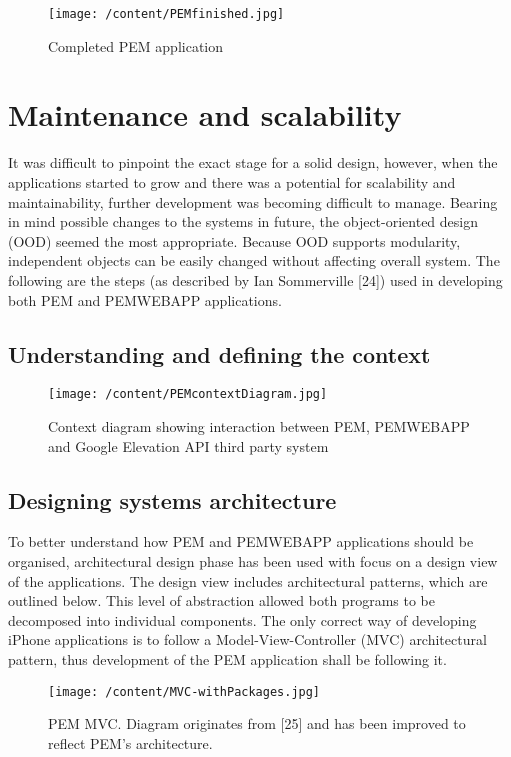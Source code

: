 \documentclass[12pt, a4paper]{report}   %
\begin{document}
\begin{enumerate}
\begin{figure}[H]
  \centering
	\texttt{[image: /content/PEMfinished.jpg]}
	  \caption{Completed PEM application}
\end{figure}


\clearpage
\section{Maintenance and scalability}
It was difficult to pinpoint the exact stage for a solid design, however, when the applications started to grow and there was a potential for scalability and maintainability, further development was becoming difficult to manage. Bearing in mind possible changes to the systems in future, the object-oriented design (OOD) seemed the most appropriate. Because OOD supports modularity, independent objects can be easily changed without affecting overall system. The following are the steps (as described by Ian Sommerville [24]) used in developing both PEM and PEMWEBAPP applications.


\subsection{Understanding and defining the context}
	
	
\begin{figure}[H]
  \centering
	\texttt{[image: /content/PEMcontextDiagram.jpg]}
	  \caption{Context diagram showing interaction between PEM, PEMWEBAPP and Google Elevation API third party system}
\end{figure}


\subsection{Designing systems architecture}
To better understand how PEM and PEMWEBAPP applications should be organised, architectural design phase has been used with focus on a design view of the applications. The design view includes architectural patterns, which are outlined below. This level of abstraction allowed both programs to be decomposed into individual components. The only correct way of developing iPhone applications is to follow a Model-View-Controller (MVC) architectural pattern, thus development of the PEM application shall be following it.\\
	

\begin{figure}[H]
  \centering
	\texttt{[image: /content/MVC-withPackages.jpg]}
	  \caption{PEM MVC. Diagram originates from [25] and has been improved to reflect PEM's architecture.}
\end{figure}



\end{enumerate}
\end{document}

